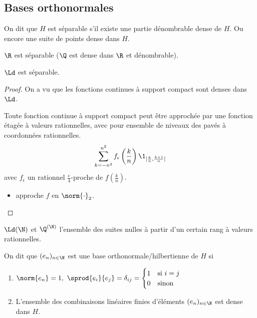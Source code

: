 \subsection{Bases orthonormales}


\begin{definition}
	On dit que $H$ est séparable s'il existe une partie dénombrable dense de $H$. Ou encore une suite de points dense dans $H$.
\end{definition}


\begin{exemple}
	$\R$ est séparable ($\Q$ est dense dans $\R$ et dénombrable).
\end{exemple}

\begin{exemple}
	$\Ld$ est séparable.
\end{exemple}

\begin{proof}
	On a vu que les fonctions continues à support compact sont denses dans $\Ld$.


	Toute fonction continue à support compact peut être approchée par une fonction étagée à valeurs rationnelles,
	avec pour ensemble de niveaux des pavés à coordonnées rationnelles.
	$$ \sum_{k=-n^2}^{n^2} f_{\epsilon} \left(\frac k n\right) \1_{[\frac k n, \frac {k+1} n[} $$
	avec $f_{\epsilon}$ un rationnel $\frac {\epsilon} 4$-proche de $f\left(\frac k n\right)$.

	\begin{itemize}
		\item approche $f$ en $\norm{\cdot}_2$.
	\end{itemize}

\end{proof}

\begin{exemple}
	$\Ld(\N)$ et $\Q^{(\N)}$ l'ensemble des suites nulles à partir d'un certain rang à valeurs rationnelles.
\end{exemple}

\begin{definition}
	On dit que $(e_n)_{n\in \N}$ est une base orthonormale/hilbertienne de $H$ si
	\begin{enumerate}
		\item $\norm {e_n} = 1, \ \sprod {e_i} {e_j} = \delta_{ij} = \begin{cases} 1 & \text{si } i=j \\ 0 & \text{sinon} \end{cases}$
		\item L'ensemble des combinaisons linéaires finies d'éléments $(e_n)_{n\in \N}$ est dense dans $H$.
	\end{enumerate}
\end{definition}


